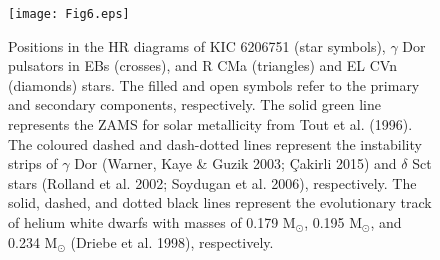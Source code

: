 \documentclass[useAMS,usenatbib,usegraphicx]{mn2e}
\begin{document}
\begin{figure}
\texttt{[image: Fig6.eps]}
\caption{Positions in the HR diagrams of KIC 6206751 (star symbols), $\gamma$ Dor pulsators in EBs (crosses), and R CMa 
(triangles) and EL CVn (diamonds) stars. The filled and open symbols refer to the primary and secondary components, 
respectively. The solid green line represents the ZAMS for solar metallicity from Tout et al. (1996). The coloured dashed and 
dash-dotted lines represent the instability strips of $\gamma$ Dor (Warner, Kaye \& Guzik 2003; \c Cakirli 2015) and 
$\delta$ Sct stars (Rolland et al. 2002; Soydugan et al. 2006), respectively. The solid, dashed, and dotted black lines 
represent the evolutionary track of helium white dwarfs with masses of 0.179 M$_\odot$, 0.195 M$_\odot$, and 0.234 M$_\odot$ 
(Driebe et al. 1998), respectively. }
\label{Fig6}
\end{figure}
\end{document}
